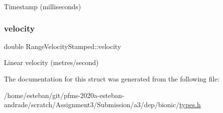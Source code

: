 Timestamp (milliseconds) \mbox{\label{structRangeVelocityStamped_a17777401a22b59317e92666f03f7fc88}} 
\subsubsection{\texorpdfstring{velocity}{velocity}}
{\footnotesize\ttfamily double Range\+Velocity\+Stamped\+::velocity}

Linear velocity (metres/second) 

The documentation for this struct was generated from the following file\+:\begin{DoxyCompactItemize}
\item 
/home/esteban/git/pfms-\/2020a-\/esteban-\/andrade/scratch/\+Assignment3/\+Submission/a3/dep/bionic/\hyperlink{bionic_2types_8h}{types.\+h}\end{DoxyCompactItemize}
